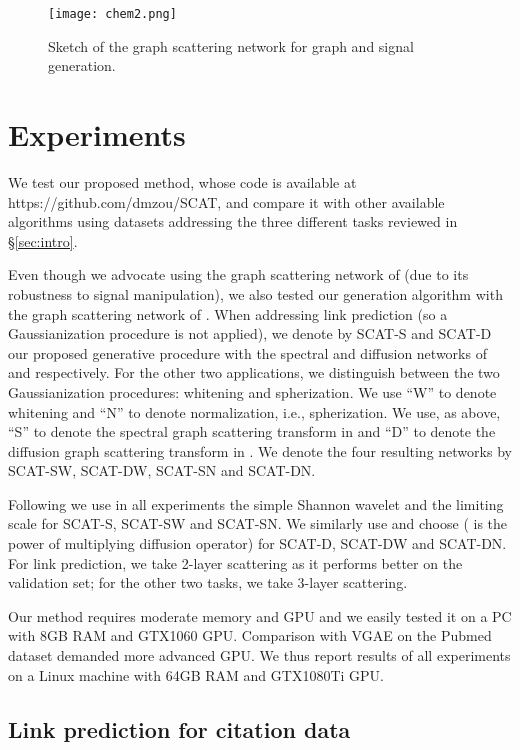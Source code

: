 \documentclass[conference]{IEEEtran}
\begin{document}
\begin{figure}[t]
    \centering
    \texttt{[image: chem2.png]}
    \caption{Sketch of the graph scattering network for graph and signal generation.} 
    \label{fig:chem}
\end{figure}


\section{Experiments}\label{sec:experiments} 
We test our proposed method, whose code is available at https://github.com/dmzou/SCAT, and compare it with other available algorithms using datasets addressing the three different tasks reviewed in \S\ref{sec:intro}.

Even though we advocate using the graph scattering network of \cite{zou2018graph} (due to its robustness to signal manipulation), we also tested our generation algorithm with the graph scattering network of \cite{gama2018diffusion}. When addressing link prediction (so a Gaussianization procedure is not applied), we denote by SCAT-S and SCAT-D our proposed generative procedure with the spectral and diffusion networks of \cite{zou2018graph} and \cite{gama2018diffusion} respectively. For the other two applications, we distinguish between the two Gaussianization procedures: whitening and spherization. 
We use ``W'' to denote whitening and ``N'' to denote normalization, i.e., spherization. We use, as above, ``S'' to denote the spectral graph scattering transform in \cite{zou2018graph} and ``D'' to denote the diffusion graph scattering transform in \cite{gama2018diffusion}. We denote the four resulting networks by SCAT-SW, SCAT-DW, SCAT-SN and SCAT-DN. 

Following \cite{zou2018graph} we use in all experiments the simple Shannon wavelet and {the limiting scale}  for SCAT-S, SCAT-SW and SCAT-SN. We similarly use  and choose  ( is the power of multiplying diffusion operator) for SCAT-D, SCAT-DW and SCAT-DN. For link prediction, we take 2-layer scattering as it performs better on the validation set; for the other two tasks, we take 3-layer scattering.


Our method requires moderate memory and GPU and we easily tested it on a PC with 8GB RAM and GTX1060 GPU. Comparison with VGAE on the Pubmed dataset demanded more advanced GPU. We thus report results of all experiments on a Linux machine with 64GB RAM and GTX1080Ti GPU.


\subsection{Link prediction for citation data}\label{subsec:linkpred}
\end{document}

